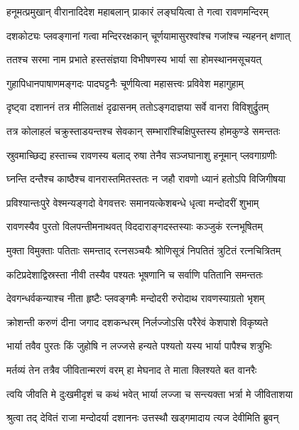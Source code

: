 \twolineshloka
{हनूमत्प्रमुखान् वीरानादिदेश महाबलान्}
{प्राकारं लङ्घयित्वा ते गत्वा रावणमन्दिरम्} %

\twolineshloka
{दशकोट्यः प्लवङ्गानां गत्वा मन्दिररक्षकान्}
{चूर्णयामासुरश्वांश्च गजांश्च न्यहनन् क्षणात्} %

\twolineshloka
{ततश्च सरमा नाम प्रभाते हस्तसंज्ञया}
{विभीषणस्य भार्या सा होमस्थानमसूचयत्} %

\twolineshloka
{गुहापिधानपाषाणमङ्गदः पादघट्टनैः}
{चूर्णयित्वा महासत्त्वः प्रविवेश महागुहाम्} %

\twolineshloka
{दृष्ट्वा दशाननं तत्र मीलिताक्षं दृढासनम्}
{ततोऽङ्गदाज्ञया सर्वे वानरा विविशुर्द्रुतम्} %

\twolineshloka
{तत्र कोलाहलं चक्रुस्ताडयन्तश्च सेवकान्}
{सम्भारांश्चिक्षिपुस्तस्य होमकुण्डे समन्ततः} %

\twolineshloka
{स्रुवमाच्छिद्य हस्ताच्च रावणस्य बलाद् रुषा}
{तेनैव सञ्जघानाशु हनूमान् प्लवगाग्रणीः} %

\twolineshloka
{घ्नन्ति दन्तैश्च काष्ठैश्च वानरास्तमितस्ततः}
{न जहौ रावणो ध्यानं हतोऽपि विजिगीषया} %

\twolineshloka
{प्रविश्यान्तःपुरे वेश्मन्यङ्गदो वेगवत्तरः}
{समानयत्केशबन्धे धृत्वा मन्दोदरीं शुभाम्} %

\twolineshloka
{रावणस्यैव पुरतो विलपन्तीमनाथवत्}
{विददाराङ्गदस्तस्याः कञ्जुकं रत्नभूषितम्} %

\twolineshloka
{मुक्ता विमुक्ताः पतिताः समन्ताद् रत्नसञ्चयैः}
{श्रोणिसूत्रं निपतितं त्रुटितं रत्नचित्रितम्} %

\twolineshloka
{कटिप्रदेशाद्विस्रस्ता नीवी तस्यैव पश्यतः}
{भूषणानि च सर्वाणि पतितानि समन्ततः} %

\twolineshloka
{देवगन्धर्वकन्याश्च नीता हृष्टैः प्लवङ्गमैः}
{मन्दोदरी रुरोदाथ रावणस्याग्रतो भृशम्} %

\twolineshloka
{क्रोशन्ती करुणं दीना जगाद दशकन्धरम्}
{निर्लज्जोऽसि परैरेवं केशपाशे विकृष्यते} %

\twolineshloka
{भार्या तवैव पुरतः किं जुहोषि न लज्जसे}
{हन्यते पश्यतो यस्य भार्या पापैश्च शत्रुभिः} %

\twolineshloka
{मर्तव्यं तेन तत्रैव जीवितान्मरणं वरम्}
{हा मेघनाद ते माता क्लिश्यते बत वानरैः} %

\twolineshloka
{त्वयि जीवति मे दुःखमीदृशं च कथं भवेत्}
{भार्या लज्जा च सन्त्यक्ता भर्त्रा मे जीविताशया} %

\twolineshloka
{श्रुत्वा तद् देवितं राजा मन्दोदर्या दशाननः}
{उत्तस्थौ खड्गमादाय त्यज देवीमिति ब्रुवन्} %

